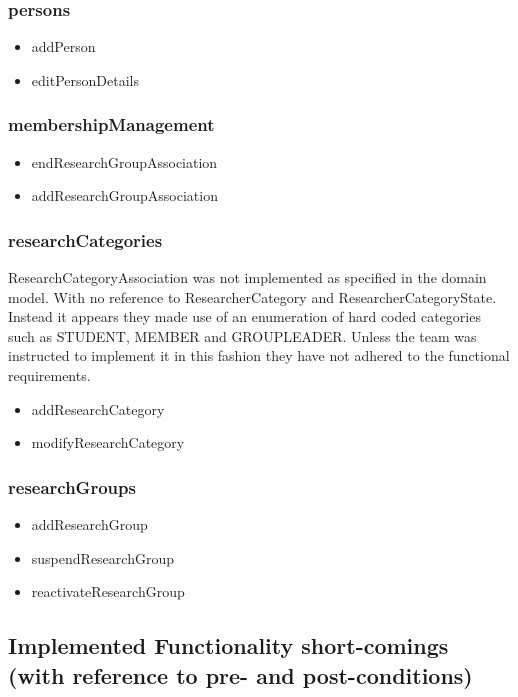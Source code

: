\documentclass{article}
\begin{document}
		\subsubsection{persons}
			\begin{itemize}
			\item addPerson
			\item editPersonDetails
			\end{itemize}
		\subsubsection{membershipManagement}
			\begin{itemize}
			\item endResearchGroupAssociation
			\item addResearchGroupAssociation
			\end{itemize}
		\subsubsection{researchCategories}
		ResearchCategoryAssociation was not implemented as specified in the domain model. With no reference to ResearcherCategory and ResearcherCategoryState. Instead it appears they made use of an enumeration of hard coded categories such as STUDENT, MEMBER and GROUPLEADER. Unless the team was instructed to implement it in this fashion they have not adhered to the functional requirements.
			\begin{itemize}
			\item addResearchCategory
			\item modifyResearchCategory
			\end{itemize}
		\subsubsection{researchGroups}
			\begin{itemize}
			\item addResearchGroup
			\item suspendResearchGroup
			\item reactivateResearchGroup
			\end{itemize}



    \subsection{Implemented Functionality short-comings (with reference to pre- and post-conditions)}
    
\end{document}
